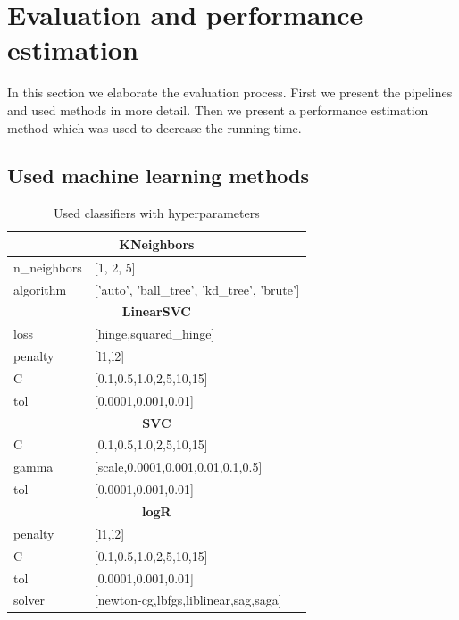 \section{Evaluation and performance estimation} \label{genens:eval}
In this section we elaborate the evaluation process. First we present the
pipelines and used methods in more detail. Then we present a performance
estimation method which was used to decrease the running time.

\subsection{Used machine learning methods} \label{tab03:methods}

{\footnotesize
\begin{longtable}{l l}

\caption{Used classifiers with hyperparameters}\\
	
\toprule
\multicolumn{2}{c}{\textbf{KNeighbors}} \\
\midrule

n\_neighbors & [1, 2, 5] \\
algorithm & ['auto', 'ball\_tree', 'kd\_tree', 'brute'] \\

\midrule
\multicolumn{2}{c}{\textbf{LinearSVC }} \\
\midrule

loss & [hinge,squared\_hinge] \\
penalty & [l1,l2] \\
C & [0.1,0.5,1.0,2,5,10,15] \\
tol & [0.0001,0.001,0.01] \\
 
\midrule
\multicolumn{2}{c}{\textbf{SVC }} \\
\midrule

C & [0.1,0.5,1.0,2,5,10,15] \\
gamma & [scale,0.0001,0.001,0.01,0.1,0.5] \\
tol & [0.0001,0.001,0.01] \\
 
\midrule
\multicolumn{2}{c}{\textbf{logR }} \\
\midrule

penalty & [l1,l2] \\
C & [0.1,0.5,1.0,2,5,10,15] \\
tol & [0.0001,0.001,0.01] \\
solver & [newton-cg,lbfgs,liblinear,sag,saga] \\
 

\end{longtable}}
